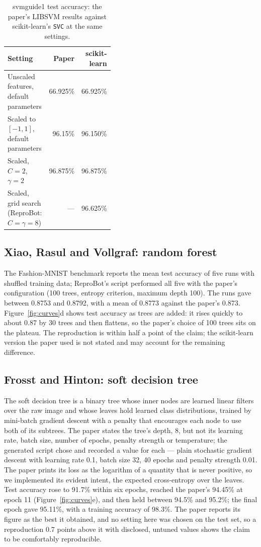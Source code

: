 \documentclass[10pt,twocolumn]{article}
\begin{document}
\begin{table}[tbp]
\centering
\small
\caption{svmguide1 test accuracy: the paper's LIBSVM results against scikit-learn's
\texttt{SVC} at the same settings.}
\label{tab:svm}
\begin{tabular}{L{0.42\linewidth}rr}
\toprule
Setting & Paper & scikit-learn \\
\midrule
Unscaled features, default parameters & 66.925\% & 66.925\% \\
Scaled to $[-1, 1]$, default parameters & 96.15\% & 96.150\% \\
Scaled, $C = 2$, $\gamma = 2$ & 96.875\% & 96.875\% \\
Scaled, grid search (ReproBot: $C = \gamma = 8$) & --- & 96.625\% \\
\bottomrule
\end{tabular}
\end{table}

\subsection{Xiao, Rasul and Vollgraf: random forest}

The Fashion-MNIST benchmark reports the mean test accuracy of five runs with shuffled training
data; ReproBot's script performed all five with the paper's configuration (100 trees, entropy
criterion, maximum depth 100). The runs gave between 0.8753 and 0.8792, with a mean of 0.8773
against the paper's 0.873. Figure~\ref{fig:curves}d shows test accuracy as trees are added: it
rises quickly to about 0.87 by 30 trees and then flattens, so the paper's choice of 100 trees
sits on the plateau. The reproduction is within half a point of the claim; the scikit-learn
version the paper used is not stated and may account for the remaining difference.

\subsection{Frosst and Hinton: soft decision tree}

The soft decision tree is a binary tree whose inner nodes are learned linear filters over the raw image and whose leaves hold learned class distributions, trained by mini-batch gradient descent with a penalty that encourages each node to use both of its subtrees. The paper states the tree's depth, 8, but not its learning rate, batch size, number of epochs, penalty strength or temperature; the generated script chose and recorded a value for each --- plain stochastic gradient descent with learning rate 0.1, batch size 32, 40 epochs and penalty strength 0.01. The paper prints its loss as the logarithm of a quantity that is never positive, so we implemented its evident intent, the expected cross-entropy over the leaves. Test accuracy rose to 91.7\% within six epochs, reached the paper's 94.45\% at epoch 11 (Figure~\ref{fig:curves}e), and then held between 94.5\% and 95.2\%; the final epoch gave 95.11\%, with a training accuracy of 98.3\%. The paper reports its figure as the best it obtained, and no setting here was chosen on the test set, so a reproduction 0.7 points above it with disclosed, untuned values shows the claim to be comfortably reproducible.
\end{document}
